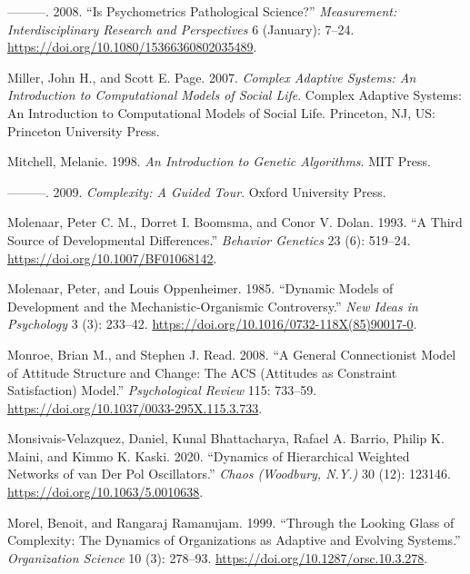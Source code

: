 \documentclass[
  a4paper,
  DIV=11,
  numbers=noendperiod,
  oneside]{scrreprt}
\newlength{\cslhangindent}
\newlength{\cslentryspacingunit} %
\newenvironment{CSLReferences}[2] %
 {%
  \setlength{\parindent}{0pt}
  \ifodd #1
  \let\oldpar\par
  \def\par{\hangindent=\cslhangindent\oldpar}
  \fi
  \setlength{\parskip}{#2\cslentryspacingunit}
 }%
 {}
\begin{document}
\begin{CSLReferences}{1}{0}
\leavevmode{}%
---------. 2008. {``Is {Psychometrics Pathological Science}?''}
\emph{Measurement: Interdisciplinary Research and Perspectives} 6
(January): 7--24. \url{https://doi.org/10.1080/15366360802035489}.

\leavevmode{}%
Miller, John H., and Scott E. Page. 2007. \emph{Complex Adaptive
Systems: {An} Introduction to Computational Models of Social Life}.
Complex Adaptive Systems: {An} Introduction to Computational Models of
Social Life. {Princeton, NJ, US}: {Princeton University Press}.

\leavevmode{}%
Mitchell, Melanie. 1998. \emph{An {Introduction} to {Genetic
Algorithms}}. {MIT Press}.

\leavevmode{}%
---------. 2009. \emph{Complexity: {A Guided Tour}}. {Oxford University
Press}.

\leavevmode{}%
Molenaar, Peter C. M., Dorret I. Boomsma, and Conor V. Dolan. 1993. {``A
Third Source of Developmental Differences.''} \emph{Behavior Genetics}
23 (6): 519--24. \url{https://doi.org/10.1007/BF01068142}.

\leavevmode{}%
Molenaar, Peter, and Louis Oppenheimer. 1985. {``Dynamic Models of
Development and the Mechanistic-Organismic Controversy.''} \emph{New
Ideas in Psychology} 3 (3): 233--42.
\url{https://doi.org/10.1016/0732-118X(85)90017-0}.

\leavevmode{}%
Monroe, Brian M., and Stephen J. Read. 2008. {``A General Connectionist
Model of Attitude Structure and Change: {The ACS} ({Attitudes} as
{Constraint Satisfaction}) Model.''} \emph{Psychological Review} 115:
733--59. \url{https://doi.org/10.1037/0033-295X.115.3.733}.

\leavevmode{}%
Monsivais-Velazquez, Daniel, Kunal Bhattacharya, Rafael A. Barrio,
Philip K. Maini, and Kimmo K. Kaski. 2020. {``Dynamics of Hierarchical
Weighted Networks of van Der {Pol} Oscillators.''} \emph{Chaos
(Woodbury, N.Y.)} 30 (12): 123146.
\url{https://doi.org/10.1063/5.0010638}.

\leavevmode{}%
Morel, Benoit, and Rangaraj Ramanujam. 1999. {``Through the {Looking
Glass} of {Complexity}: {The Dynamics} of {Organizations} as {Adaptive}
and {Evolving Systems}.''} \emph{Organization Science} 10 (3): 278--93.
\url{https://doi.org/10.1287/orsc.10.3.278}.


\end{CSLReferences}
\end{document}
